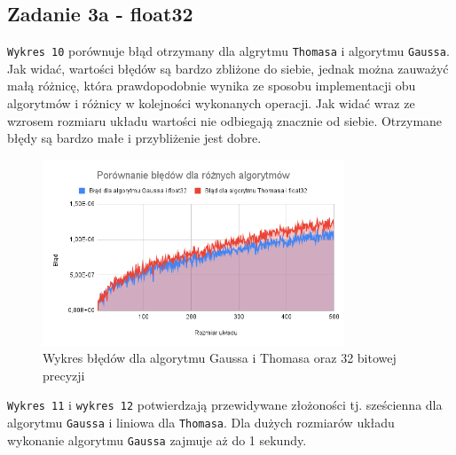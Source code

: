 \documentclass{article}
\begin{document}
\newpage

\subsection{Zadanie 3a - float32}

\noindent
\texttt{Wykres 10} porównuje błąd otrzymany dla algrytmu \texttt{Thomasa} i algorytmu \texttt{Gaussa}. Jak widać, wartości błędów są bardzo zbliżone do siebie, jednak można zauważyć małą różnicę, która prawdopodobnie wynika ze sposobu implementacji obu algorytmów i różnicy w kolejności wykonanych operacji. Jak widać wraz ze wzrosem rozmiaru układu wartości nie odbiegają znacznie od siebie. Otrzymane błędy są bardzo małe i przybliżenie jest dobre.

\begin{figure}[H]
  \centering
    \includegraphics[width=0.8\textwidth]{img10.png}
  \caption{Wykres błędów dla algorytmu Gaussa i Thomasa oraz 32 bitowej precyzji}
\end{figure}

\texttt{Wykres 11} i \texttt{wykres 12} potwierdzają przewidywane złożoności tj. sześcienna dla algorytmu \texttt{Gaussa} i liniowa dla \texttt{Thomasa}. Dla dużych rozmiarów układu wykonanie algorytmu \texttt{Gaussa} zajmuje aż do 1 sekundy. 
\end{document}
